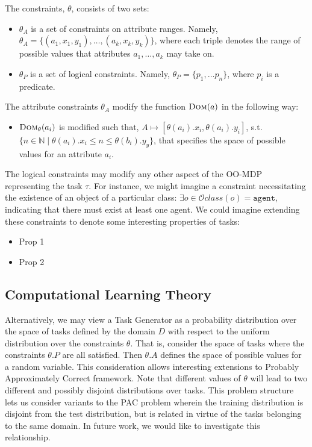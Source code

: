 \documentclass[11pt]{article}
\begin{document}
The constraints, $\theta$, consists of two sets:

\begin{itemize}
\item $\theta_{A}$ is a set of constraints on attribute ranges. Namely, $\theta_{A} = \{ (a_1, x_1, y_1), \ldots, (a_k, x_k, y_k) \}$, where each triple denotes the range of possible values that attributes $a_1, \ldots, a_k$ may take on.
\item $\theta_{P}$ is a set of logical constraints. Namely, $\theta_P = \{p_1, \ldots p_n\}$, where $p_i$ is a predicate.
\end{itemize}

The attribute constraints $\theta_A$ modify the function $\textsc{Dom}(a)$ in the following way:

\begin{itemize}
\item $\textsc{Dom}_\theta(a_i)$ is modified such that, $A \mapsto [\theta(a_i).x_i,\theta(a_i).y_i]$, s.t. $\{n \in \mathbb{N} \mid \theta(a_i).x_i \leq n \leq \theta(b_i).y_y \}$, that specifies the space of possible values for an attribute $a_i$.
\end{itemize}

The logical constraints may modify any other aspect of the OO-MDP representing the task $\tau$. For instance, we might imagine a constraint necessitating the existence of an object of a particular class: $\exists o \in \mathcal{O} class(o) = \texttt{agent}$, indicating that there must exist at least one agent. We could imagine extending these constraints to denote some interesting properties of tasks:

\begin{itemize}
\item Prop 1
\item Prop 2
\end{itemize}

\subsection{Computational Learning Theory}
Alternatively, we may view a Task Generator as a probability distribution over the space of tasks defined by the domain $D$ with respect to the uniform distribution over the constraints $\theta$. That is, consider the space of tasks where the constraints $\theta.P$ are all satisfied. Then $\theta.A$ defines the space of possible values for a random variable. This consideration allows interesting extensions to Probably Approximately Correct framework. Note that different values of $\theta$ will lead to two different and possibly disjoint distributions over tasks. This problem structure lets us consider variants to the PAC problem wherein the training distribution is disjoint from the test distribution, but is related in virtue of the tasks belonging to the same domain. In future work, we would like to investigate this relationship.
\end{document}

